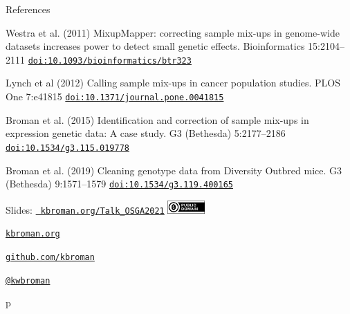 \documentclass[12pt,t,aspectratio=169]{beamer}
\begin{document}
\begin{frame}[c]{References}

  \bbi

  \item Westra et al. (2011) MixupMapper: correcting sample mix-ups in
    genome-wide datasets increases power to detect small genetic
    effects. Bioinformatics 15:2104--2111
    \href{https://doi.org/10.1093/bioinformatics/btr323}{\tt doi:10.1093/bioinformatics/btr323}

  \item Lynch et al (2012) Calling sample mix-ups in cancer population
    studies. PLOS One 7:e41815
    \href{https://doi.org/10.1371/journal.pone.0041815}{\tt doi:10.1371/journal.pone.0041815}

  \item Broman et al. (2015) Identification and correction of sample
    mix-ups in expression genetic data: A case study. G3 (Bethesda)
    5:2177--2186
    \href{https://doi.org/10.1534/g3.115.019778}{\tt doi:10.1534/g3.115.019778}

  \item Broman et al. (2019) Cleaning genotype data from Diversity
    Outbred mice. G3 (Bethesda) 9:1571--1579
    \href{https://doi.org/10.1534/g3.119.400165}{\tt doi:10.1534/g3.119.400165}

  \ei


\end{frame}


\begin{frame}[c]{}

\Large

Slides: \href{https://kbroman.org/Talk_OSGA2021}{\tt
  kbroman.org/Talk\_OSGA2021} \quad
\includegraphics[height=5mm]{Figs/cc-zero.png}

\vspace{7mm}

\href{https://kbroman.org}{\tt \lolit kbroman.org}

\vspace{7mm}

\href{https://github.com/kbroman}{\tt \lolit github.com/kbroman}

\vspace{7mm}

\href{https://twitter.com/kwbroman}{\tt \lolit @kwbroman}


\end{frame}

p
\end{document}
